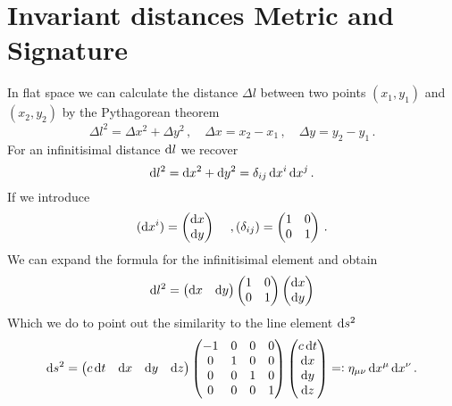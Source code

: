 \section{Invariant distances Metric and Signature}
In flat space we can calculate the distance $\Delta l$ between two points
$(x_1,y_1)$ and $(x_2,y_2)$ by the Pythagorean theorem
\begin{equation}
\Delta l^2=\Delta x^2+\Delta y^2\, ,
\quad \Delta x=x_2-x_1\,,\quad \Delta
y=y_2-y_1\, .
\end{equation}
For an infinitisimal distance $\dif l$ we recover
\begin{equation}
\dif l^2=\dif x^2+\dif y^2=\delta_{ij}\dif x^i\dif x^j\, .
\end{equation}
If we introduce
\begin{equation}
(\dif x^i)=\begin{pmatrix}
\dif x\\
\dif y
\end{pmatrix}\,\quad ,(\delta_{ij})=\begin{pmatrix}
1 & 0\\
0 & 1
\end{pmatrix}\, .
\end{equation}
We can expand the formula for the infinitisimal element and obtain
\begin{equation}
\dif l^2=\begin{pmatrix}
\dif x & 
\dif y
\end{pmatrix}
\begin{pmatrix}
1 & 0\\
0 & 1
\end{pmatrix}
\begin{pmatrix}
\dif x\\
\dif y
\end{pmatrix}
\end{equation}
Which we do to point out the similarity to the line element $\dif s^2$
\begin{equation}
\dif s^2=\begin{pmatrix}
c\dif t & 
\dif x & 
\dif y &
\dif z 
\end{pmatrix}
\begin{pmatrix}
-1 & 0 & 0 & 0\\
0  & 1 & 0 & 0\\
0  & 0 & 1 & 0\\
0  & 0 & 0 & 1\\
\end{pmatrix}
\begin{pmatrix}
c\dif t\\
\dif x\\
\dif y\\
\dif z\\
\end{pmatrix}=:\eta_{\mu\nu}\dif x^\mu\dif x^\nu\, .
\end{equation}
